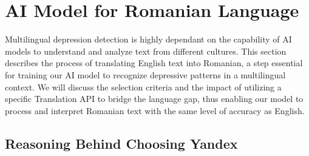 \chapter{AI Model for Romanian Language}
\label{chap:ch4}
\par \quad Multilingual depression detection is highly dependant on the capability of AI models to understand and analyze text from different cultures. This section describes the process of translating English text into Romanian, a step essential for training our AI model to recognize depressive patterns in a multilingual context. We will discuss the selection criteria and the impact of utilizing a specific Translation API to bridge the language gap, thus enabling our model to process and interpret Romanian text with the same level of accuracy as English. 

\section{Reasoning Behind Choosing Yandex}

